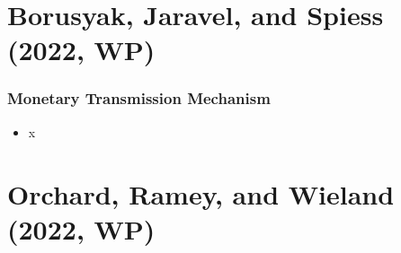 \documentclass[english,xcolor=svgnames]{beamer}
\begin{document}
\section{Borusyak, Jaravel, and Spiess (2022, WP)}

\begin{frame}
\frametitle[alignment=center]{Monetary Transmission Mechanism}
\begin{itemize}
	\item x
\end{itemize}
\end{frame}

\section{Orchard, Ramey, and Wieland (2022, WP)}
\end{document}
